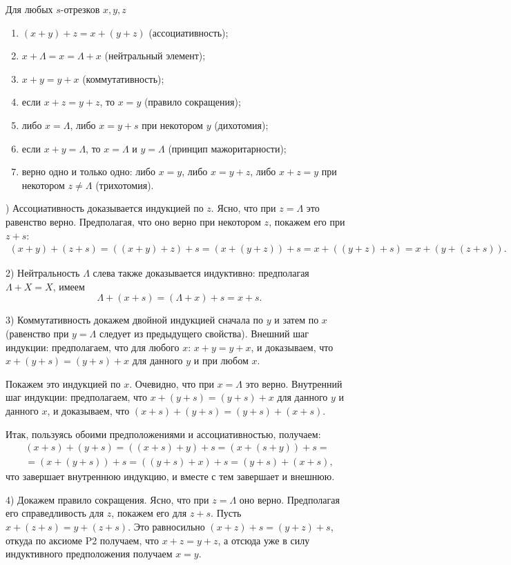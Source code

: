 \begin{thrm}\label{Summ} Для любых $s$-отрезков $x,y,z$
\begin{enumerate}[S1]
\item $(x+y)+z=x+(y+z)$ (ассоциативность);
\item $x+\Lambda=x=\Lambda+x$ (нейтральный элемент);
\item $x+y=y+x$ (коммутативность);
\item если $x+z=y+z$, то $x=y$ (правило сокращения);
\item либо $x=\Lambda$, либо $x=y+s$ при некотором $y$ (дихотомия);
\item если $x+y=\Lambda$, то $x=\Lambda$ и $y=\Lambda$ (принцип мажоритарности);
\item верно одно и только одно: либо $x=y$, либо $x=y+z$, либо $x+z=y$ при некотором $z\ne\Lambda$ (трихотомия).
\end{enumerate}
\end{thrm}
) Ассоциативность доказывается индукцией по $z$. Ясно, что при $z=\Lambda$ это равенство верно.
Предполагая, что оно верно при некотором $z$, покажем его при $z+s$:
\begin{multline*}
(x+y)+(z+s) = ((x+y)+z)+s = (x+(y+z))+s = x+((y+z)+s) = x+(y+(z+s)).
\end{multline*}

2) Нейтральность $\Lambda$ слева также доказывается индуктивно: предполагая $\Lambda+X=X$, имеем
$$
\Lambda+(x+s) = (\Lambda+x)+s = x+s.
$$

3) Коммутативность докажем двойной индукцией сначала по $y$ и затем по $x$ (равенство при $y=\Lambda$ следует из предыдущего свойства).
Внешний шаг индукции: предполагаем, что для любого $x$: $x+y=y+x$, и доказываем, что $x+(y+s) = (y+s)+x$ для данного $y$ и при любом $x$.

Покажем это индукцией по $x$. Очевидно, что при $x=\Lambda$ это верно. Внутренний шаг индукции: предполагаем, что $x+(y+s) = (y+s)+x$ для данного $y$ и данного $x$, и доказываем, что $(x+s)+(y+s) = (y+s)+(x+s)$.

Итак, пользуясь обоими предположениями и ассоциативностью, получаем:
\begin{multline*}
(x+s)+(y+s) = ((x+s)+y)+s =(x+(s+y))+s = \\
= (x + (y+s))+s = ((y+s)+x)+s = (y+s)+(x+s),
\end{multline*}
что завершает внутреннюю индукцию, и вместе с тем завершает и внешнюю.

4) Докажем правило сокращения. Ясно, что при $z=\Lambda$ оно верно. Предполагая его справедливость для $z$, покажем его для $z+s$.
Пусть $x+(z+s)=y+(z+s)$. Это равносильно $(x+z)+s=(y+z)+s$, откуда по аксиоме P2 получаем, что $x+z=y+z$, а отсюда уже в силу индуктивного предположения получаем $x=y$.

